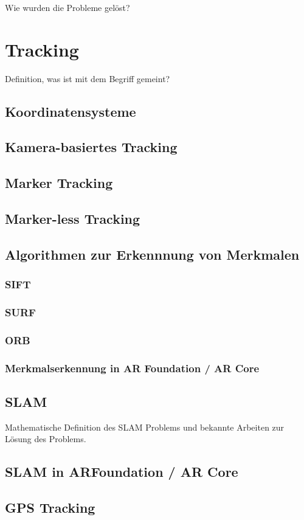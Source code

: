 Wie wurden die Probleme gelöst?

\section{Tracking}
Definition, was ist mit dem Begriff gemeint?
\subsection{Koordinatensysteme}
\subsection{Kamera-basiertes Tracking}
\subsection{Marker Tracking}
\subsection{Marker-less Tracking}
\subsection{Algorithmen zur Erkennnung von Merkmalen}
\subsubsection{SIFT}
\subsubsection{SURF}
\subsubsection{ORB}
\subsubsection{Merkmalserkennung in AR Foundation / AR Core}
\subsection{SLAM}
Mathematische Definition des SLAM Problems und bekannte Arbeiten zur Lösung des Problems.
\subsection{SLAM in ARFoundation / AR Core}
\subsection{GPS Tracking}


